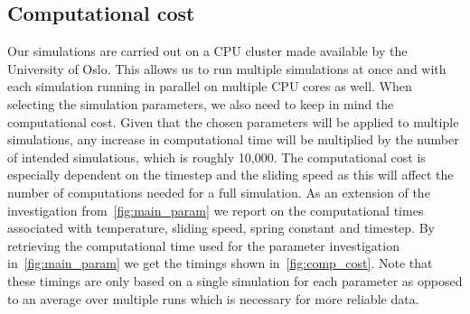 \subsection{Computational cost}
Our simulations are carried out on a CPU cluster made available by the University of Oslo. This allows us to run multiple simulations at once and with each simulation running in parallel on multiple CPU cores as well. When selecting the simulation parameters, we also need to keep in mind the computational cost. Given that the chosen parameters will be applied to multiple simulations, any increase in computational time will be multiplied by the number of intended simulations, which is roughly 10,000. The computational cost is especially dependent on the timestep and the sliding speed as this will affect the number of computations needed for a full simulation. As an extension of the investigation from~\cref{fig:main_param} we
report on the computational times associated with temperature, sliding speed,
spring constant and timestep. By retrieving the computational time used for the
parameter investigation in~\cref{fig:main_param} we get the timings shown in~\cref{fig:comp_cost}. Note that these timings are only based on a single simulation for each parameter as opposed to an average over multiple runs which is
necessary for more reliable data. 


